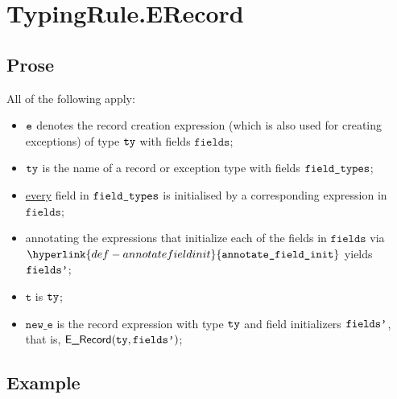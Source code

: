 \documentclass{book}
\newcommand\ProseOrTypeError[0]{\ProseTerminateAs{\TypeErrorConfig}}
\newcommand\annotatefieldinit[0]{\hyperlink{def-annotatefieldinit}{\texttt{annotate\_field\_init}}}
\newcommand\vt[0]{\texttt{t}}
\newcommand\fields[0]{\texttt{fields}}
\newcommand\newe[0]{\texttt{new\_e}}
\begin{document}

\section{TypingRule.ERecord \label{sec:TypingRule.ERecord}}

\subsection{Prose}
All of the following apply:
\begin{itemize}
  \item $\texttt{e}$ denotes the record creation expression (which is also used for creating exceptions) of type $\texttt{ty}$ with fields $\fields$;
  \item $\texttt{ty}$ is the name of a record or exception type with fields $\texttt{field\_types}$;
  \item \underline{every} field in $\texttt{field\_types}$ is initialised by a corresponding expression in $\fields$;
  \item annotating the expressions that initialize each of the fields in $\fields$ via \\
        $\annotatefieldinit$ yields $\texttt{fields'}$\ProseOrTypeError;
  \item $\vt$ is $\texttt{ty}$;
  \item $\newe$ is the record expression with type $\texttt{ty}$ and field initializers $\texttt{fields'}$, that is, $\textsf{E\_Record}(\texttt{ty}, \texttt{fields'})$;
\end{itemize}

\subsection{Example}

\end{document}
